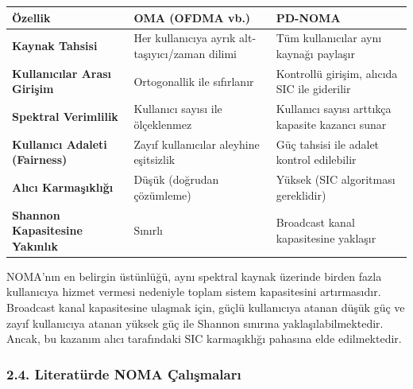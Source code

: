 \documentclass[
]{IEEEtran}
\newcounter{none} %
\begin{document}
{\def\LTcaptype{none} %
\begin{longtable}[]{@{}
  >{\raggedright\arraybackslash}p{}
  >{\raggedright\arraybackslash}p{}
  >{\raggedright\arraybackslash}p{}@{}}
\toprule\noalign{}
\begin{minipage}[b]{\linewidth}\raggedright
Özellik
\end{minipage} & \begin{minipage}[b]{\linewidth}\raggedright
OMA (OFDMA vb.)
\end{minipage} & \begin{minipage}[b]{\linewidth}\raggedright
PD-NOMA
\end{minipage} \\
\midrule\noalign{}
\endhead
\bottomrule\noalign{}
\endlastfoot
\textbf{Kaynak Tahsisi} & Her kullanıcıya ayrık alt-taşıyıcı/zaman
dilimi & Tüm kullanıcılar aynı kaynağı paylaşır \\
\textbf{Kullanıcılar Arası Girişim} & Ortogonallik ile sıfırlanır &
Kontrollü girişim, alıcıda SIC ile giderilir \\
\textbf{Spektral Verimlilik} & Kullanıcı sayısı ile ölçeklenmez &
Kullanıcı sayısı arttıkça kapasite kazancı sunar \\
\textbf{Kullanıcı Adaleti (Fairness)} & Zayıf kullanıcılar aleyhine
eşitsizlik & Güç tahsisi ile adalet kontrol edilebilir \\
\textbf{Alıcı Karmaşıklığı} & Düşük (doğrudan çözümleme) & Yüksek (SIC
algoritması gereklidir) \\
\textbf{Shannon Kapasitesine Yakınlık} & Sınırlı & Broadcast kanal
kapasitesine yaklaşır \\
\end{longtable}
}

NOMA'nın en belirgin üstünlüğü, aynı spektral kaynak üzerinde birden
fazla kullanıcıya hizmet vermesi nedeniyle toplam sistem kapasitesini
artırmasıdır. Broadcast kanal kapasitesine ulaşmak için, güçlü
kullanıcıya atanan düşük güç ve zayıf kullanıcıya atanan yüksek güç ile
Shannon sınırına yaklaşılabilmektedir. Ancak, bu kazanım alıcı
tarafındaki SIC karmaşıklığı pahasına elde edilmektedir.

\subsubsection{2.4. Literatürde NOMA
Çalışmaları}\label{literatuxfcrde-noma-uxe7alux131ux15fmalarux131}
\end{document}
